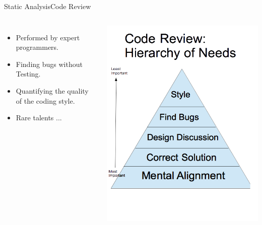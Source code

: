 \begin{frame}{Static Analysis}{Code Review}
\begin{columns}
\begin{itemize}
	\item Performed by expert programmers.
	\item Finding bugs without Testing.
	\item Quantifying the quality of the coding style.
	\item Rare talents ...
\end{itemize}
\centering
\includegraphics[scale=0.3]{content/images/static-analysis/review.png}
\end{columns}
\end{frame}


